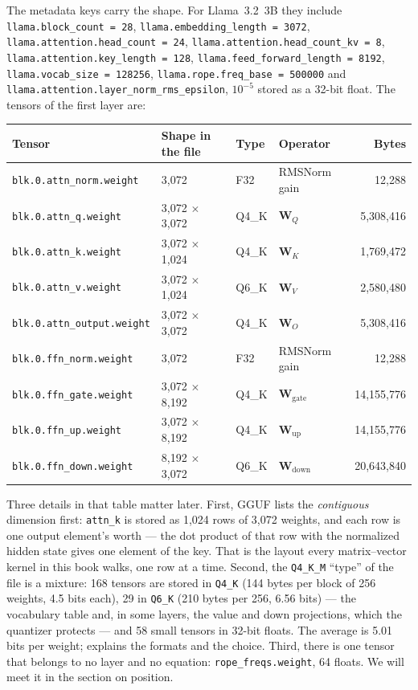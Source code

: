 
\noindent The metadata keys carry the shape. For Llama~3.2~3B they include
\texttt{llama.block\_count = 28}, \texttt{llama.embedding\_length = 3072},
\texttt{llama.attention.head\_count = 24},
\texttt{llama.attention.head\_count\_kv = 8},
\texttt{llama.attention.key\_length = 128},
\texttt{llama.feed\_forward\_length = 8192},
\texttt{llama.vocab\_size = 128256},
\texttt{llama.rope.freq\_base = 500000} and
\texttt{llama.attention.layer\_norm\_rms\_epsilon}, $10^{-5}$ stored as a
32-bit float. The tensors of the first layer are:

\begin{center}\small
\begin{tabular}{@{}llllr@{}}
\toprule
Tensor & Shape in the file & Type & Operator & Bytes \\
\midrule
\texttt{blk.0.attn\_norm.weight} & 3,072 & F32 & RMSNorm gain & 12,288 \\
\texttt{blk.0.attn\_q.weight} & 3,072 $\times$ 3,072 & Q4\_K & $\mathbf{W}_Q$ & 5,308,416 \\
\texttt{blk.0.attn\_k.weight} & 3,072 $\times$ 1,024 & Q4\_K & $\mathbf{W}_K$ & 1,769,472 \\
\texttt{blk.0.attn\_v.weight} & 3,072 $\times$ 1,024 & Q6\_K & $\mathbf{W}_V$ & 2,580,480 \\
\texttt{blk.0.attn\_output.weight} & 3,072 $\times$ 3,072 & Q4\_K & $\mathbf{W}_O$ & 5,308,416 \\
\texttt{blk.0.ffn\_norm.weight} & 3,072 & F32 & RMSNorm gain & 12,288 \\
\texttt{blk.0.ffn\_gate.weight} & 3,072 $\times$ 8,192 & Q4\_K & $\mathbf{W}_{\mathrm{gate}}$ & 14,155,776 \\
\texttt{blk.0.ffn\_up.weight} & 3,072 $\times$ 8,192 & Q4\_K & $\mathbf{W}_{\mathrm{up}}$ & 14,155,776 \\
\texttt{blk.0.ffn\_down.weight} & 8,192 $\times$ 3,072 & Q6\_K & $\mathbf{W}_{\mathrm{down}}$ & 20,643,840 \\
\bottomrule
\end{tabular}
\end{center}

\noindent Three details in that table matter later. First, GGUF lists the
\emph{contiguous} dimension first: \texttt{attn\_k} is stored as 1,024 rows of
3,072 weights, and each row is one output element's worth --- the dot product
of that row with the normalized hidden state gives one element of the key.
That is the layout every matrix--vector kernel in this book walks, one row at
a time. Second, the \texttt{Q4\_K\_M} ``type'' of the file is a mixture: 168
tensors are stored in \texttt{Q4\_K} (144 bytes per block of 256 weights, 4.5
bits each), 29 in \texttt{Q6\_K} (210 bytes per 256, 6.56 bits) --- the
vocabulary table and, in some layers, the value and down projections, which
the quantizer protects --- and 58 small tensors in 32-bit floats. The
average is 5.01 bits per weight;  explains the
formats and the choice. Third, there is one tensor that belongs to no
layer and no equation: \texttt{rope\_freqs.weight}, 64 floats. We will meet it
in the section on position.

